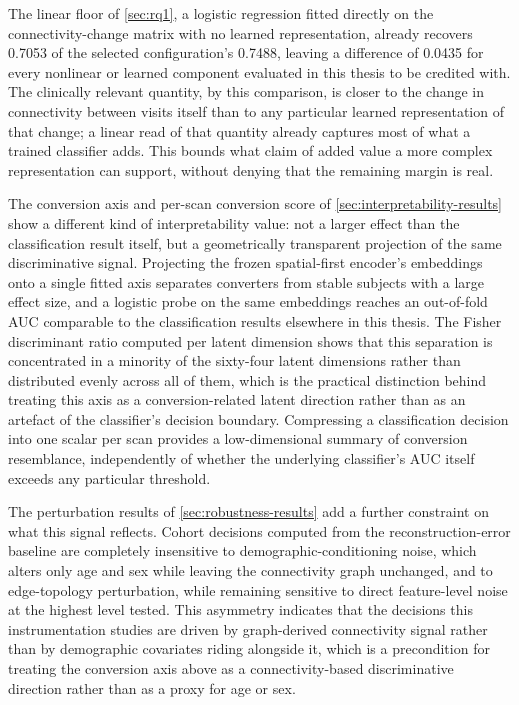 The linear floor of \autoref{sec:rq1}, a logistic regression fitted directly on the
connectivity-change matrix with no learned representation, already recovers 0.7053 of the
selected configuration's 0.7488, leaving a difference of 0.0435 for every nonlinear or
learned component evaluated in this thesis to be credited with. The clinically relevant
quantity, by this comparison, is closer to the change in connectivity between visits itself
than to any particular learned representation of that change; a linear read of that
quantity already captures most of what a trained classifier adds. This bounds what claim of
added value a more complex representation can support, without denying that the remaining
margin is real.

The conversion axis and per-scan conversion score of \autoref{sec:interpretability-results} show a
different kind of interpretability value: not a larger effect than the classification result itself,
but a geometrically transparent projection of the same discriminative signal. Projecting the frozen spatial-first
encoder's embeddings onto a single fitted axis separates converters from stable subjects
with a large effect size, and a logistic probe on the same embeddings reaches an
out-of-fold \ac{AUC} comparable to the classification results elsewhere in this thesis. The
Fisher discriminant ratio computed per latent dimension shows that this separation is
concentrated in a minority of the sixty-four latent dimensions rather than distributed
evenly across all of them, which is the practical distinction behind treating this axis as
a conversion-related latent direction rather than as an artefact of the classifier's decision boundary.
Compressing a classification decision into one scalar per scan provides a low-dimensional summary
of conversion resemblance, independently of whether the underlying classifier's \ac{AUC} itself exceeds any particular
threshold.

The perturbation results of \autoref{sec:robustness-results} add a further constraint on
what this signal reflects. Cohort decisions computed from the reconstruction-error baseline
are completely insensitive to demographic-conditioning noise, which alters only age and sex
while leaving the connectivity graph unchanged, and to edge-topology perturbation, while
remaining sensitive to direct feature-level noise at the highest level tested. This
asymmetry indicates that the decisions this instrumentation studies are driven by
graph-derived connectivity signal rather than by demographic covariates riding alongside
it, which is a precondition for treating the conversion axis above as a connectivity-based
discriminative direction rather than as a proxy for age or sex.

